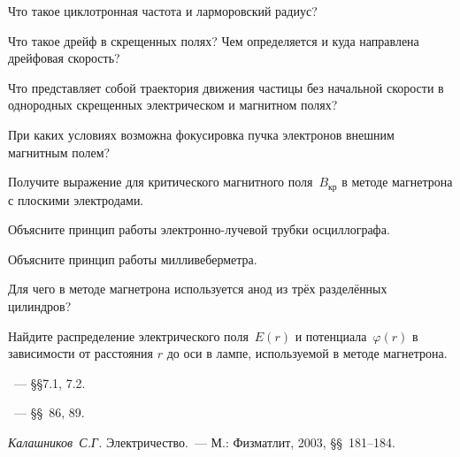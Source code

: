 \begin{lab:questions}
\item Что такое циклотронная частота и ларморовский радиус?
\item Что такое дрейф в скрещенных полях? 
Чем определяется и куда направлена дрейфовая скорость?
\item Что представляет собой траектория движения частицы без начальной скорости 
в однородных скрещенных электрическом и магнитном полях?
\item При каких условиях возможна фокусировка пучка электронов внешним 
магнитным полем?
\item Получите выражение для критического магнитного поля~$B_{кр}$ 
в методе магнетрона
с плоскими электродами.
\item Объясните принцип работы электронно-лучевой трубки осциллографа.
\item Объясните принцип работы милливеберметра.
\item Для чего в методе магнетрона используется анод из трёх разделённых цилиндров?
\item Найдите распределение электрического поля~$E(r)$ и потенциала~$\varphi(r)$ 
в зависимости от расстояния $r$ до оси в лампе, используемой в методе магнетрона.
\end{lab:questions}

\begin{lab:literature}
    \item \Kirichenko~--- \S\S7.1, 7.2.
    \item \SivuhinIII~--- \S\S~86, 89.
\item \emph{Калашников~С.Г.} Электричество.~--- М.: Физматлит, 2003,
\S\S~181--184.
\end{lab:literature}


